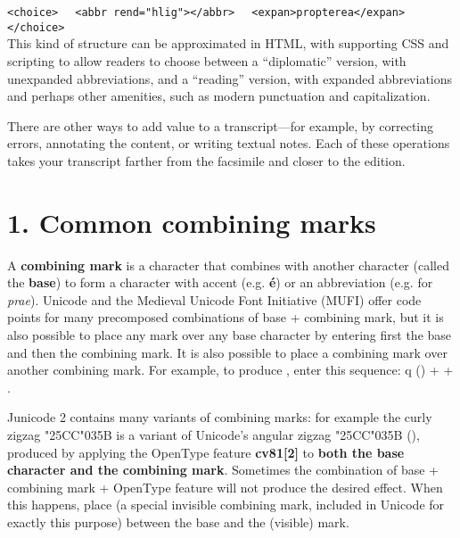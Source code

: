 \noindent\verb!<choice>!\newline
\verb!  <abbr rend="hlig">!\textrm{}\verb!</abbr>!\newline
\verb!  <expan>propterea</expan>!\newline
\verb!</choice>!\\[1ex]

\noindent This kind of structure can be approximated in HTML, with supporting CSS and scripting to allow readers to choose between
a ``diplomatic'' version, with unexpanded abbreviations, and a ``reading'' version, with expanded abbreviations and
perhaps other amenities, such as modern punctuation and capitalization.

There are other ways to add value to a transcript---for example, by correcting errors, annotating the content, or
writing textual notes. Each of these operations takes your transcript farther from the facsimile and closer to the
edition.

\section[1. Common combining marks]{1. Common combining marks}
A \textbf{combining mark} is a character that combines with another character (called the \textbf{base}) to form a
character with accent (e.g. \textbf{\'e}) or an abbreviation (e.g. \textbf{} for \textit{prae}).
Unicode and the Medieval Unicode Font Initiative (MUFI) offer code points for many precomposed combinations of base +
combining mark, but it is also possible to place any mark over any base character by entering first the base and then
the combining mark. It is also possible to place a combining mark over another combining mark. For example, to produce
\textbf{}, enter this sequence: q () +  + .

Junicode 2 contains many variants of combining marks: for example the curly zigzag {\char"25CC\char"035B} is a variant of
Unicode's angular zigzag {\char"25CC\char"035B} (), produced by applying the OpenType feature \textbf{cv81[2]} to \textbf{both the base character and the combining mark}. Sometimes the combination of base + combining mark + OpenType
feature will not produce the desired effect. When this happens, place  (a special invisible combining mark,
included in Unicode for exactly this purpose) between the base and the (visible) mark.\\

